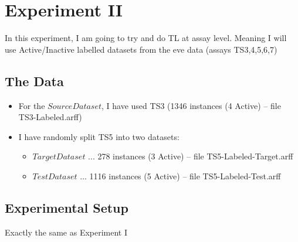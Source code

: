 \documentclass[a4paper,12pt, english]{article}
\begin{document}

\newpage


\section{Experiment II}
In this experiment, I am going to try and do TL at assay level. Meaning I will use Active/Inactive labelled datasets from the eve data (assays TS3,4,5,6,7)
\subsection{The Data}
\begin{itemize}
\item For the $Source Dataset$, I have used TS3 (1346 instances (4 Active) -- file TS3-Labeled.arff)
\item I have randomly split TS5 into two datasets:
\begin{itemize}
\item $Target Dataset$ ... 278 instances (3 Active) -- file TS5-Labeled-Target.arff
\item $Test Dataset$ ... 1116 instances (5 Active) -- file TS5-Labeled-Test.arff
\end{itemize}
\end{itemize}  

\subsection{Experimental Setup}
Exactly the same as Experiment I
\end{document}
